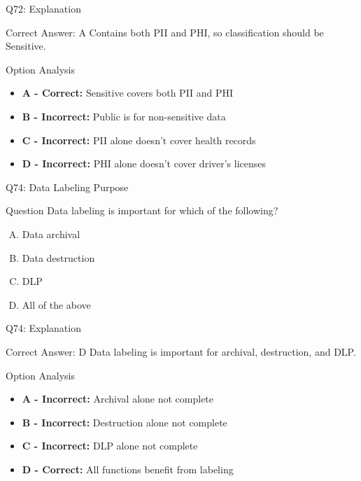 \documentclass{beamer}
\begin{document}
	\begin{frame}{Q72: Explanation}
		\begin{block}{Correct Answer: A}
			Contains both PII and PHI, so classification should be Sensitive.
		\end{block}
		\begin{block}{Option Analysis}
			\begin{itemize}
				\item \textbf{A - Correct:} Sensitive covers both PII and PHI
				\item \textbf{B - Incorrect:} Public is for non-sensitive data
				\item \textbf{C - Incorrect:} PII alone doesn't cover health records
				\item \textbf{D - Incorrect:} PHI alone doesn't cover driver's licenses
			\end{itemize}
		\end{block}
	\end{frame}
	

	\begin{frame}{Q74: Data Labeling Purpose}
		\begin{block}{Question}
			Data labeling is important for which of the following?
		\end{block}
		\begin{enumerate}[(A)]
			\item Data archival
			\item Data destruction
			\item DLP
			\item All of the above
		\end{enumerate}
	\end{frame}
	
	\begin{frame}{Q74: Explanation}
		\begin{block}{Correct Answer: D}
			Data labeling is important for archival, destruction, and DLP.
		\end{block}
		\begin{block}{Option Analysis}
			\begin{itemize}
				\item \textbf{A - Incorrect:} Archival alone not complete
				\item \textbf{B - Incorrect:} Destruction alone not complete
				\item \textbf{C - Incorrect:} DLP alone not complete
				\item \textbf{D - Correct:} All functions benefit from labeling
			\end{itemize}
		\end{block}
	\end{frame}
	
\end{document}
